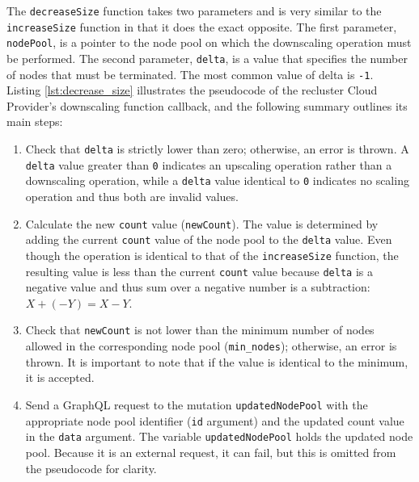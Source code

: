 The \texttt{decreaseSize} function takes two parameters and is very similar to
the \texttt{increaseSize} function in that it does the exact opposite. The first
parameter, \texttt{nodePool}, is a pointer to the node pool on which the downscaling
operation must be performed. The second parameter, \texttt{delta}, is a value that
specifies the number of nodes that must be terminated. The most common value of
delta is \texttt{-1}. \\ %
Listing \ref{lst:decrease_size} illustrates the pseudocode of the recluster
Cloud Provider's downscaling function callback, and the following summary outlines
its main steps:

\begin{enumerate}[label=\protect\circled{\arabic{*}}]
  \item Check that \texttt{delta} is strictly lower than zero; otherwise, an
    error is thrown.
    \newline
    A \texttt{delta} value greater than \texttt{0} indicates an upscaling operation
    rather than a downscaling operation, while a \texttt{delta} value identical to
    \texttt{0} indicates no scaling operation and thus both are invalid values.

  \item Calculate the new \texttt{count} value (\texttt{newCount}).
    \newline
    The value is determined by adding the current \texttt{count} value of the node
    pool to the \texttt{delta} value.
    \newline
    Even though the operation is identical to that of the \texttt{increaseSize}
    function, the resulting value is less than the current \texttt{count} value
    because \texttt{delta} is a negative value and thus sum over a negative number
    is a subtraction: $X + (-Y) = X - Y$.

  \item Check that \texttt{newCount} is not lower than the minimum number of
    nodes allowed in the corresponding node pool (\texttt{min\_nodes});
    otherwise, an error is thrown.
    \newline
    It is important to note that if the value is identical to the minimum, it is
    accepted.

  \item Send a GraphQL request to the mutation \texttt{updatedNodePool} with the
    appropriate node pool identifier (\texttt{id} argument) and the updated count
    value in the \texttt{data} argument. The variable \texttt{updatedNodePool}
    holds the updated node pool.
    \newline
    Because it is an external request, it can fail, but this is omitted from the
    pseudocode for clarity.


\end{enumerate}
